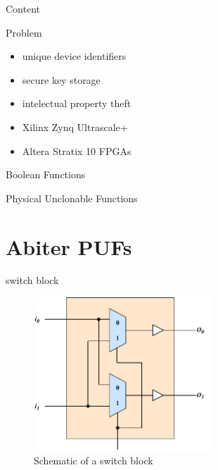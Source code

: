 \documentclass[10pt, compress]{beamer}
\begin{document}
\begin{frame}{Content}
    \tableofcontents
\end{frame}

\begin{frame}{Problem}
    \begin{itemize}
        \item unique device identifiers
        \item secure key storage
        \item intelectual property theft
        \item Xilinx Zynq Ultrascale+ 
        \item Altera Stratix 10 FPGAs
    \end{itemize}
\end{frame}



\begin{frame}{Boolean Functions}
    
\end{frame}


\begin{frame}{Physical Unclonable Functions}
    
\end{frame}

\section{Abiter PUFs}

\begin{frame}{switch block}
    \begin{figure}
        \centering
        \includegraphics[width=0.6\textwidth]{figures/switch_block_detailed.pdf}
        \caption{Schematic of a switch block}
    \end{figure}
\end{frame}
\end{document}

